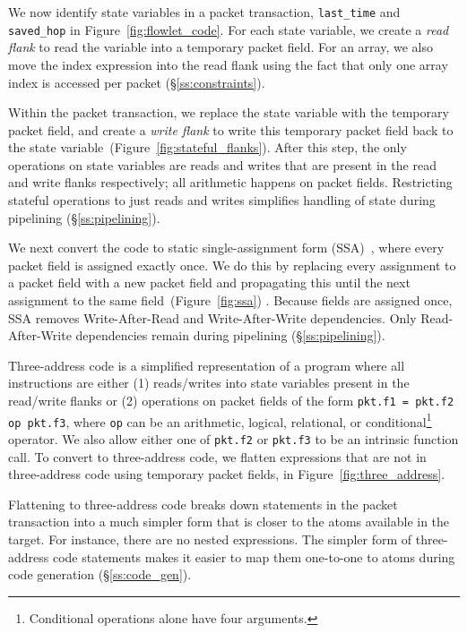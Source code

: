  We now identify state variables
in a packet transaction, \eg \texttt{last\_time} and \texttt{saved\_hop} in
Figure~\ref{fig:flowlet_code}.  For each state variable, we create a
\textit{read flank} to read the variable into a temporary packet field.  For an
array, we also move the index expression into the read flank using the fact
that only one array index is accessed per packet (\S\ref{ss:constraints}).

Within the packet transaction, we replace the state variable with the temporary
packet field, and create a \textit{write flank} to write this temporary packet
field back to the state variable~(Figure~\ref{fig:stateful_flanks}). After this
step, the only operations on state variables are reads and writes that are
present in the read and write flanks respectively; all arithmetic happens on
packet fields. Restricting stateful operations to just reads and writes
simplifies handling of state during pipelining (\S\ref{ss:pipelining}).

 We next convert the code to
static single-assignment form (SSA)~\cite{ssa}, where every packet field is
assigned exactly once. We do this by replacing every assignment to a packet
field with a new packet field and propagating this until the next assignment to
the same field~(Figure~\ref{fig:ssa}) .  Because fields are assigned once, SSA
removes Write-After-Read and Write-After-Write dependencies.  Only
Read-After-Write dependencies remain during pipelining (\S\ref{ss:pipelining}).

 Three-address code is a simplified
representation of a program where all instructions are either (1) reads/writes
into state variables present in the read/write flanks or (2) operations on
packet fields of the form \texttt{pkt.f1 = pkt.f2 op pkt.f3}, where \texttt{op}
can be an arithmetic, logical, relational, or conditional\footnote{Conditional
operations alone have four arguments.} operator. We also allow either one of
{\tt pkt.f2} or {\tt pkt.f3} to be an intrinsic function call.  To convert to
three-address code, we flatten expressions that are not in three-address code
using temporary packet fields,  in
Figure~\ref{fig:three_address}.

Flattening to three-address code breaks down statements in the packet
transaction into a much simpler form that is closer to the atoms available in
the \absmachine target. For instance, there are no nested expressions. The
simpler form of three-address code statements makes it easier to map them
one-to-one to atoms during code generation (\S\ref{ss:code_gen}).

